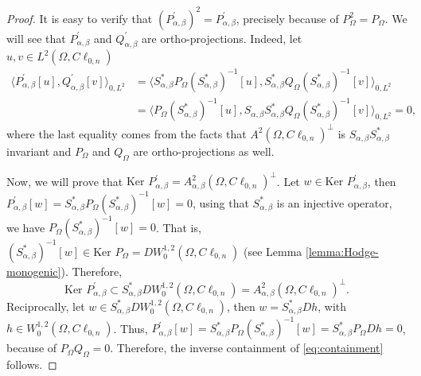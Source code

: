 \documentclass[12pt]{article}
\begin{document}
\begin{proof}
It is easy to verify that $(P_{\alpha,\beta}^{\prime})^2=P_{\alpha,\beta}^{\prime}$, precisely because of $P_{\Omega}^2=P_{\Omega}$. 
We will see that $P_{\alpha,\beta}^{\prime}$ and $Q_{\alpha,\beta}^{\prime}$ are ortho-projections. Indeed, let $u,v\in L^2(\Omega,C\ell_{0,n})$
\begin{align*}
   \langle P_{\alpha,\beta}^{\prime}[u],Q_{\alpha,\beta}^{\prime}[v]\rangle_{0,L^2}&=\langle S_{\alpha,\beta}^*P_{\Omega} (S_{\alpha,\beta}^*)^{-1}[u],S_{\alpha,\beta}^*Q_{\Omega} (S_{\alpha,\beta}^*)^{-1}[v]\rangle_{0,L^2}\\
	&=\langle P_{\Omega} (S_{\alpha,\beta}^*)^{-1}[u], S_{\alpha,\beta}S_{\alpha,\beta}^*Q_{\Omega} (S_{\alpha,\beta}^*)^{-1}[v]\rangle_{0,L^2}=0,
\end{align*}
where the last equality comes from the facts that $A^2(\Omega,C\ell_{0,n})^{\bot}$ is $S_{\alpha,\beta}S_{\alpha,\beta}^*$ invariant and $P_{\Omega}$ and $Q_{\Omega}$ are ortho-projections as well. 

Now, we will prove that $\text{Ker } P_{\alpha,\beta}^{\prime}=A_{\alpha,\beta}^2(\Omega,C\ell_{0,n})^{\bot}$.
Let $w\in \text{Ker } P_{\alpha,\beta}^{\prime}$, then $P_{\alpha,\beta}^{\prime}[w]=S_{\alpha,\beta}^*P_{\Omega} (S_{\alpha,\beta}^*)^{-1}[w]=0$, using that $S_{\alpha,\beta}^*$ is an injective operator, we have $P_{\Omega} (S_{\alpha,\beta}^*)^{-1}[w]=0$. That is, $(S_{\alpha,\beta}^*)^{-1}[w]\in \text{Ker } P_{\Omega}=D W_0^{1,2}(\Omega,C\ell_{0,n})$ (see Lemma \ref{lemma:Hodge-monogenic}). Therefore, 
\begin{equation}\label{eq:containment}
\text{Ker } P_{\alpha,\beta}^{\prime}\subset S_{\alpha,\beta}^*D W_0^{1,2}(\Omega,C\ell_{0,n})=A_{\alpha,\beta}^2(\Omega,C\ell_{0,n})^{\bot}.
\end{equation}
Reciprocally, let $w\in S_{\alpha,\beta}^*D W_0^{1,2}(\Omega,C\ell_{0,n})$, then $w=S_{\alpha,\beta}^*Dh$, with $h\in  W_0^{1,2}(\Omega,C\ell_{0,n})$. Thus, $P_{\alpha,\beta}^{\prime} [w]=S_{\alpha,\beta}^*P_{\Omega} (S_{\alpha,\beta}^*)^{-1}[w]=S_{\alpha,\beta}^*P_{\Omega} Dh=0$, because of $P_{\Omega}Q_{\Omega}=0$. Therefore, the inverse containment of \eqref{eq:containment} follows.


\end{proof}
\end{document}
